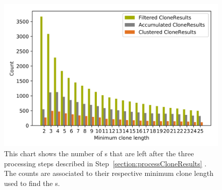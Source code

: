 
\begin{figure}
	\centering
	\includegraphics[width=0.8\linewidth]{figures/Thresholds/processed.png}
	\caption[Processed CloneResults in relation to the minimum clone length]{
		This chart shows the number of
		 s
		  that are left after the three processing steps described in
		   Step~\ref{section:processCloneResults}
		   . The counts are associated to their respective minimum clone length used to find the 
		   s.
	}
	\label{fig:thresholdsProcessed}
\end{figure}
